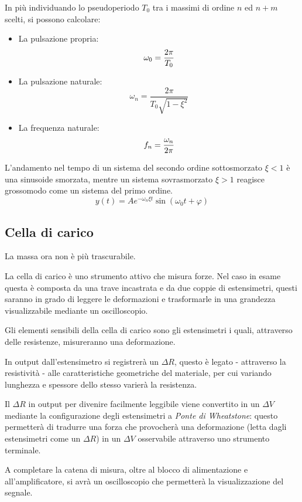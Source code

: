 \documentclass[a4paper, 12pt, twoside]{report}
\begin{document}
		In più individuando lo pseudoperiodo $T_0$ tra i massimi di ordine $n$ ed $n+m$ scelti, si possono calcolare:
		\begin{itemize}
		\item La pulsazione propria:
		\[\omega_0 = {2\pi\over T_0}\] 
		\item La pulsazione naturale:
		\[\omega_n = \dfrac{2\pi}{T_0\sqrt{1-\xi^2}}\]
		\item La frequenza naturale:
		\[f_n = {\omega_n\over2\pi}\]
		\end{itemize}
		L’andamento nel tempo di un sistema del secondo ordine sottosmorzato $\xi<1$ è una sinusoide smorzata, mentre un sistema sovrasmorzato $\xi>1$ reagisce grossomodo come un sistema del primo ordine.
		\[y(t) = Ae^{-\omega_n\xi t}\sin(\omega_0t+\varphi)\]
		
\newpage
		
		\subsection{Cella di carico}
		
		La massa ora non è più trascurabile.\newline
		
		La cella di carico è uno strumento attivo che misura forze. Nel caso in esame questa è composta da una trave incastrata e da due coppie di estensimetri, questi saranno in grado di leggere le deformazioni e trasformarle in una grandezza visualizzabile mediante un oscilloscopio. 
		
		Gli elementi sensibili della cella di carico sono gli estensimetri i quali, attraverso delle resistenze, misureranno una deformazione. 
		
		In output dall'estensimetro si registrerà un $\Delta R$, questo è legato  - attraverso la resistività - alle caratteristiche geometriche del materiale, per cui variando lunghezza e spessore dello stesso varierà la resistenza. 		
		
		Il $\Delta R$ in output per divenire facilmente leggibile viene convertito in un $\Delta V$ mediante la configurazione degli estensimetri a \textit{Ponte di Wheatstone}: questo permetterà di tradurre una forza che provocherà una deformazione (letta dagli estensimetri come un $\Delta R$) in un $\Delta V$ osservabile attraverso uno strumento terminale. 
		
		A completare la catena di misura, oltre al blocco di alimentazione e all'amplificatore, si avrà un oscilloscopio che permetterà la visualizzazione del segnale. 
		
\end{document}
